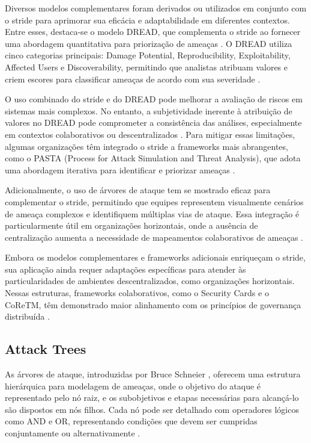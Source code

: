 Diversos modelos complementares foram derivados ou utilizados em
conjunto com o \gls{stride} para aprimorar sua eficácia e adaptabilidade em
diferentes contextos. Entre esses, destaca-se o modelo DREAD, que
complementa o \gls{stride} ao fornecer uma abordagem quantitativa para
priorização de ameaças \cite{DREADful}. O DREAD utiliza cinco
categorias principais: Damage Potential, Reproducibility,
Exploitability, Affected Users e Discoverability, permitindo que
analistas atribuam valores e criem escores para classificar ameaças de
acordo com sua severidade
\cite{SoftwareandattackcentricThreatModeling}.

O uso combinado do \gls{stride} e do DREAD pode melhorar a avaliação de
riscos em sistemas mais complexos. No entanto, a subjetividade
inerente à atribuição de valores no DREAD pode comprometer a
consistência das análises, especialmente em contextos colaborativos ou
descentralizados \cite{DREADful}. Para mitigar essas limitações,
algumas organizações têm integrado o \gls{stride} a frameworks mais
abrangentes, como o PASTA (Process for Attack Simulation and Threat
Analysis), que adota uma abordagem iterativa para identificar e
priorizar ameaças \cite{SoftwareandattackcentricThreatModeling}.

Adicionalmente, o uso de árvores de ataque tem se mostrado eficaz para
complementar o \gls{stride}, permitindo que equipes representem visualmente
cenários de ameaça complexos e identifiquem múltiplas vias de ataque.
Essa integração é particularmente útil em organizações horizontais,
onde a ausência de centralização aumenta a necessidade de mapeamentos
colaborativos de ameaças \cite{ThreatModelingdesigningForSecurity}.

Embora os modelos complementares e frameworks adicionais enriqueçam o
\gls{stride}, sua aplicação ainda requer adaptações específicas para atender
às particularidades de ambientes descentralizados, como organizações
horizontais. Nessas estruturas, frameworks colaborativos, como o
Security Cards e o CoReTM, têm demonstrado maior alinhamento com os
princípios de governança distribuída
\cite{SoftwareandattackcentricThreatModeling}.

\subsection{Attack Trees}
\label{subsec:attack_trees}

As árvores de ataque, introduzidas por Bruce Schneier
\cite{AttackTrees}, oferecem uma estrutura hierárquica para modelagem
de ameaças, onde o objetivo do ataque é representado pelo nó raiz, e
os subobjetivos e etapas necessárias para alcançá-lo são dispostos em
nós filhos. Cada nó pode ser detalhado com operadores lógicos como AND
e OR, representando condições que devem ser cumpridas conjuntamente ou
alternativamente \cite{FoundationsofAttackTrees}.


